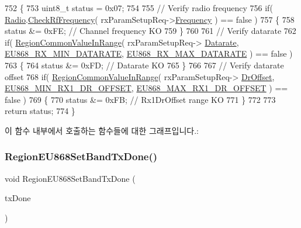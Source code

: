 \begin{DoxyCode}
752 \{
753     uint8\_t status = 0x07;
754 
755     \textcolor{comment}{// Verify radio frequency}
756     \textcolor{keywordflow}{if}( \mbox{\hyperlink{sx1276mb1las_8c_acf9fe61a72c16fa29a0dc449d23e3820}{Radio}}.\mbox{\hyperlink{struct_radio__s_a984f224d5ef26fb8a35f77d664f384df}{CheckRfFrequency}}( rxParamSetupReq->\mbox{\hyperlink{structs_rx_param_setup_req_params_ade3d190636488dad9a89b19446b7acf1}{Frequency}} ) == false )
757     \{
758         status &= 0xFE; \textcolor{comment}{// Channel frequency KO}
759     \}
760 
761     \textcolor{comment}{// Verify datarate}
762     \textcolor{keywordflow}{if}( \mbox{\hyperlink{group___r_e_g_i_o_n_c_o_m_m_o_n_gafdd1c80d953e18d755a631b72a9c3bd3}{RegionCommonValueInRange}}( rxParamSetupReq->
      \mbox{\hyperlink{structs_rx_param_setup_req_params_ae2f6080f3aa0e9485c55513ca56bb24d}{Datarate}}, \mbox{\hyperlink{group___r_e_g_i_o_n_e_u868_gaa1bdf9b64650b847961424f9098278fc}{EU868\_RX\_MIN\_DATARATE}}, 
      \mbox{\hyperlink{group___r_e_g_i_o_n_e_u868_ga84a09a53f67ea79b84d27a56e51679ab}{EU868\_RX\_MAX\_DATARATE}} ) == false )
763     \{
764         status &= 0xFD; \textcolor{comment}{// Datarate KO}
765     \}
766 
767     \textcolor{comment}{// Verify datarate offset}
768     \textcolor{keywordflow}{if}( \mbox{\hyperlink{group___r_e_g_i_o_n_c_o_m_m_o_n_gafdd1c80d953e18d755a631b72a9c3bd3}{RegionCommonValueInRange}}( rxParamSetupReq->
      \mbox{\hyperlink{structs_rx_param_setup_req_params_ad920e18a48423b1eb1fe40d1b2b082d4}{DrOffset}}, \mbox{\hyperlink{group___r_e_g_i_o_n_e_u868_gac803b58ed61f47042654f6e0331b26db}{EU868\_MIN\_RX1\_DR\_OFFSET}}, 
      \mbox{\hyperlink{group___r_e_g_i_o_n_e_u868_ga90ce5649045707b0bbaaa0bbd039940b}{EU868\_MAX\_RX1\_DR\_OFFSET}} ) == false )
769     \{
770         status &= 0xFB; \textcolor{comment}{// Rx1DrOffset range KO}
771     \}
772 
773     \textcolor{keywordflow}{return} status;
774 \}
\end{DoxyCode}
이 함수 내부에서 호출하는 함수들에 대한 그래프입니다.\+:
\mbox{\label{group___r_e_g_i_o_n_e_u868_ga5cf25bd6be48790f3f637d60a236fdb1}} 
\subsubsection{\texorpdfstring{Region\+E\+U868\+Set\+Band\+Tx\+Done()}{RegionEU868SetBandTxDone()}}
{\footnotesize\ttfamily void Region\+E\+U868\+Set\+Band\+Tx\+Done (\begin{DoxyParamCaption}\item[{\mbox{\hyperlink{group___r_e_g_i_o_n_gad0524aa0673c0814a71e7a4f9cade3fc}{Set\+Band\+Tx\+Done\+Params\+\_\+t}} $\ast$}]{tx\+Done }\end{DoxyParamCaption})}



